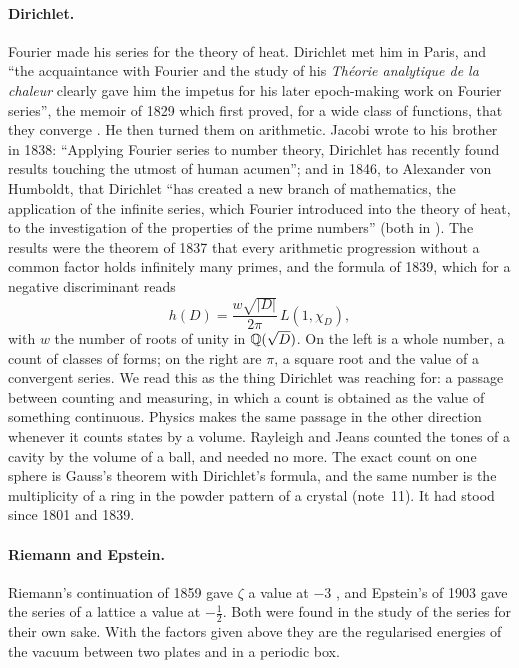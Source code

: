 \documentclass[11pt]{article}
\begin{document}
\paragraph{Dirichlet.}
Fourier made his series for the theory of heat.
Dirichlet met him in Paris, and ``the acquaintance with Fourier and the study of his \emph{Th\'eorie analytique de la chaleur} clearly gave him the impetus for his later epoch-making work on Fourier series'', the memoir of 1829 which first proved, for a wide class of functions, that they converge \cite{Elstrodt}.
He then turned them on arithmetic.
Jacobi wrote to his brother in 1838: ``Applying Fourier series to number theory, Dirichlet has recently found results touching the utmost of human acumen''; and in 1846, to Alexander von Humboldt, that Dirichlet ``has created a new branch of mathematics, the application of the infinite series, which Fourier introduced into the theory of heat, to the investigation of the properties of the prime numbers'' (both in \cite{Elstrodt}).
The results were the theorem of 1837 that every arithmetic progression without a common factor holds infinitely many primes, and the formula of 1839, which for a negative discriminant reads
\[
  h(D) = \frac{w\sqrt{|D|}}{2\pi}\,L(1,\chi_D),
\]
with $w$ the number of roots of unity in $\mathbb{Q}(\sqrt D)$.
On the left is a whole number, a count of classes of forms; on the right are $\pi$, a square root and the value of a convergent series.
We read this as the thing Dirichlet was reaching for: a passage between counting and measuring, in which a count is obtained as the value of something continuous.
Physics makes the same passage in the other direction whenever it counts states by a volume.
Rayleigh and Jeans counted the tones of a cavity by the volume of a ball, and needed no more.
The exact count on one sphere is Gauss's theorem with Dirichlet's formula, and the same number is the multiplicity of a ring in the powder pattern of a crystal (note~11).
It had stood since 1801 and 1839.

\paragraph{Riemann and Epstein.}
Riemann's continuation of 1859 gave $\zeta$ a value at $-3$ \cite{Riemann}, and Epstein's of 1903 gave the series of a lattice a value at $-\tfrac12$.
Both were found in the study of the series for their own sake.
With the factors given above they are the regularised energies of the vacuum between two plates and in a periodic box.
\end{document}
